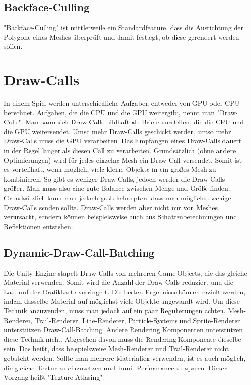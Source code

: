\subsection{Backface-Culling}
"Backface-Culling" ist mittlerweile ein Standardfeature, dass die Ausrichtung der Polygone eines Meshes überprüft und damit festlegt, ob diese gerendert werden sollen.
\cite{_cryengine_culling}

\section{Draw-Calls}
In einem Spiel werden unterschiedliche Aufgaben entweder von GPU oder CPU berechnet.
Aufgaben, die die CPU und die GPU weitergibt, nennt man "Draw-Calls". Man kann sich Draw-Calls bildhaft als Briefe vorstellen, die die CPU und die GPU weitersendet. Umso mehr Draw-Calls geschickt werden, umso mehr Draw-Calls muss die GPU verarbeiten. Das Empfangen eines Draw-Calls dauert in der Regel länger als diesen Call zu verarbeiten. Grundsätzlich (ohne andere Optimierungen) wird für jedes einzelne Mesh ein Draw-Call versendet. Somit ist es vorteilhaft, wenn möglich, viele kleine Objekte in ein großes Mesh zu kombinieren. So gibt es weniger Draw-Calls, jedoch werden die Draw-Calls größer. Man muss also eine gute Balance zwischen Menge und Größe finden. Grundsätzlich kann man jedoch grob behaupten, dass man möglichst wenige Draw-Calls senden sollte. Draw-Calls werden aber nicht nur von Meshes verursacht, sondern können beispielsweise auch aus Schattenberechnungen und Reflektionen entstehen.
\cite{_drawcallbatching}

\subsection{Dynamic-Draw-Call-Batching}
Die Unity-Engine stapelt Draw-Calls von mehreren Game-Objects, die das gleiche Material verwenden. Somit wird die Anzahl der Draw-Calls reduziert und die Last auf der Grafikkarte verringert. Die besten Ergebnisse können erzielt werden, indem dasselbe Material auf möglichst viele Objekte angewandt wird. Um diese Technik anzuwenden, muss man jedoch auf ein paar Regulierungen achten. Mesh-Renderer, Trail-Renderer, Line-Renderer, Particle-Systems und Sprite-Renderer unterstützen Draw-Call-Batching. Andere Rendering Komponenten unterstützen diese Technik nicht. Abgesehen davon muss die Rendering-Komponente dieselbe sein. Das heißt, dass beispielsweise.Mesh-Renderer und Trail-Renderer nicht gebatcht werden. Sollte man mehrere Materialien verwenden, ist es auch möglich, die gleiche Textur zu einzusetzen und damit Performance zu sparen. Dieser Vorgang heißt "Texture-Atlasing".
\cite{_drawcallbatching}

